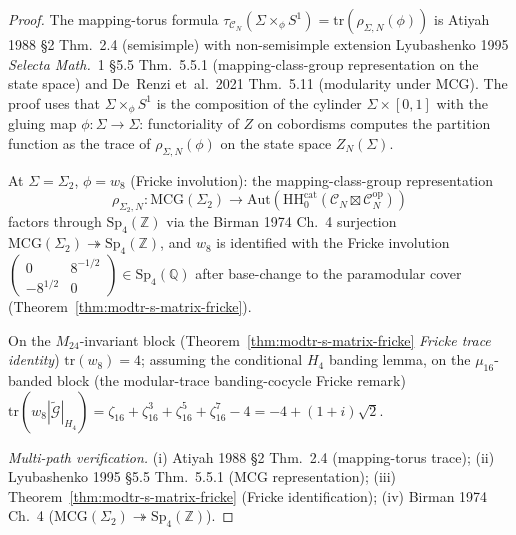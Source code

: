 \begin{proof}
The mapping-torus formula
\(\tau_{\mathcal C_N}(\Sigma\times_\phi S^1)
= \mathrm{tr}(\rho_{\Sigma,N}(\phi))\) is Atiyah 1988 \S 2 Thm.~2.4
(semisimple) with non-semisimple extension
Lyubashenko 1995 \emph{Selecta Math.}~1 \S 5.5 Thm.~5.5.1
(mapping-class-group representation on the state space) and
De~Renzi et~al.\ 2021 Thm.~5.11 (modularity under $\mathrm{MCG}$).
The proof uses that $\Sigma\times_\phi S^1$ is the composition of
the cylinder $\Sigma\times [0, 1]$ with the gluing map
$\phi\colon\Sigma\to\Sigma$: functoriality of $Z$ on cobordisms
computes the partition function as the trace of \(\rho_{\Sigma,N}(\phi)\)
on the state space \(Z_N(\Sigma)\).

At $\Sigma = \Sigma_2$, $\phi = w_8$ (Fricke involution): the
mapping-class-group representation
\[
\rho_{\Sigma_2,N}\colon\mathrm{MCG}(\Sigma_2)\longrightarrow
\mathrm{Aut}
(\mathrm{HH}_0^{\mathrm{cat}}(\mathcal C_N\boxtimes\mathcal C_N^{\mathrm{op}}))
\]
factors through $\mathrm{Sp}_4(\mathbb Z)$ via the Birman 1974 Ch.~4
surjection $\mathrm{MCG}(\Sigma_2)\twoheadrightarrow\mathrm{Sp}_4(\mathbb Z)$,
and $w_8$ is identified with the Fricke involution
$\left(\begin{smallmatrix}0 & 8^{-1/2}\\ -8^{1/2} & 0\end{smallmatrix}
\right)\in\mathrm{Sp}_4(\mathbb Q)$ after base-change to the
paramodular cover (Theorem~\ref{thm:modtr-s-matrix-fricke}).

On the $M_{24}$-invariant block
(Theorem~\ref{thm:modtr-s-matrix-fricke} \emph{Fricke trace identity})
$\mathrm{tr}(w_8) = 4$; assuming the conditional $H_4$ banding lemma, on the $\mu_{16}$-banded block
(the modular-trace banding-cocycle Fricke remark)
$\mathrm{tr}(w_8|\widetilde{\mathcal G}|_{H_4}) = \zeta_{16}
+ \zeta_{16}^3 + \zeta_{16}^5 + \zeta_{16}^7 - 4 = -4 + (1+i)\sqrt 2$.

\emph{Multi-path verification.}
(i) Atiyah 1988 \S 2 Thm.~2.4 (mapping-torus trace);
(ii) Lyubashenko 1995 \S 5.5 Thm.~5.5.1 (MCG representation);
(iii) Theorem~\ref{thm:modtr-s-matrix-fricke} (Fricke identification);
(iv) Birman 1974 Ch.~4 ($\mathrm{MCG}(\Sigma_2)
\twoheadrightarrow\mathrm{Sp}_4(\mathbb Z)$).
\end{proof}

